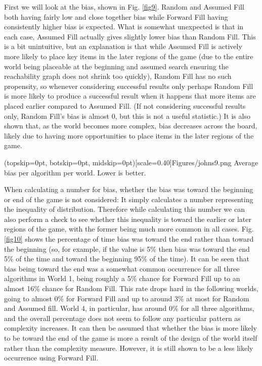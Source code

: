 \documentclass{ieeeaccess}
\begin{document}
First we will look at the bias, shown in Fig. \ref{fig9}. Random and Assumed Fill both having
fairly low and close together bias while Forward Fill having consistently higher bias is
expected. What is somewhat unexpected is that in each case, Assumed Fill actually gives
slightly lower bias than Random Fill. This is a bit unintuitive, but an explanation is that
while Assumed Fill is actively more likely to place key items in the later regions of the game 
(due to the entire world being placeable at the beginning and assumed search ensuring the 
reachability graph does not shrink too quickly),
Random Fill has no such propensity, so whenever considering successful results only perhaps
Random Fill is more likely to produce a successful result when it happens that more items are
placed earlier compared to Assumed Fill. (If not considering successful results only, Random
Fill’s bias is almost 0, but this is not a useful statistic.) It is also shown that, as the
world becomes more complex, bias decreases across the board, likely due to having more
opportunities to place items in the later regions of the game. 

\Figure[t!](topskip=0pt, botskip=0pt, midskip=0pt)[scale=0.40]{Figures/johns9.png}
{Average bias per algorithm per world. Lower is better.\label{fig9}}

When calculating a number for bias, whether the bias was toward the beginning or end of the
game is not considered: It simply calculates a number representing the inequality of
distribution. Therefore while calculating this number we can also perform a check to see
whether this inequality is toward the earlier or later regions of the game, with the former
being much more common in all cases. Fig. \ref{fig10} shows the percentage of time bias was toward 
the end rather than toward the beginning (so, for example, if the value is 5\% then bias was toward 
the end 5\% of the time and toward the beginning 95\% of the time). It can be seen that bias being
toward the end was a somewhat common occurrence for all three algorithms in World 1, being
roughly a 5\% chance for Forward Fill up to an almost 16\% chance for Random Fill. This rate
drops hard in the following worlds, going to almost 0\% for Forward Fill and up to around 3\%
at most for Random and Assumed fill. World 4, in particular, has around 0\% for all three
algorithms, and the overall percentage does not seem to follow any particular pattern as
complexity increases. It can then be assumed that whether the bias is more likely to be toward
the end of the game is more a result of the design of the world itself rather than the
complexity measure. However, it is still shown to be a less likely occurrence using Forward
Fill.
\end{document}
